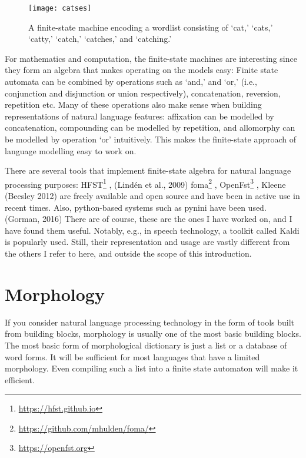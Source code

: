 \documentclass[free]{flammie}
\begin{document}
\begin{figure}

    \texttt{[image: catses]}
    \caption{A finite-state machine encoding a wordlist consisting of ‘cat,’ ‘cats,’
    ‘catty,’ ‘catch,’ ‘catches,’ and ‘catching.’\label{fig:}}
\end{figure}

For mathematics and computation, the finite-state machines are interesting since they form
an algebra that makes operating on the models easy: Finite state automata can be combined
by operations such as ‘and,’ and ‘or,’ (i.e., conjunction and disjunction or union
respectively), concatenation, reversion, repetition etc. Many of these operations also make
sense when building representations of natural language features: affixation can be
modelled by concatenation, compounding can be modelled by repetition, and allomorphy
can be modelled by operation ‘or’ intuitively. This makes the finite-state approach of
language modelling easy to work on.

There are several tools that implement finite-state algebra for natural language
processing purposes: HFST\footnote{\url{https://hfst.github.io}}
, (Lindén et al., 2009) foma\footnote{\url{https://github.com/mhulden/foma/}}
, OpenFst\footnote{\url{https://openfst.org}}
, Kleene (Beesley 2012)
are freely available and open source and have been in active use in recent times. Also,
python-based systems such as pynini have been used. (Gorman, 2016) There are of course,
these are the ones I have worked on, and I have found them useful. Notably, e.g., in speech
technology, a toolkit called Kaldi is popularly used. Still, their representation and usage are
vastly different from the others I refer to here, and outside the scope of this introduction.

\section{Morphology}

If you consider natural language processing technology in the form of tools
built from building blocks, morphology is usually one of the most basic building
blocks. The most basic form of morphological dictionary is just a list or a
database of word forms. It will be sufficient for most languages that have a
limited morphology. Even compiling such a list into a finite state automaton
will make it efficient.
\end{document}
